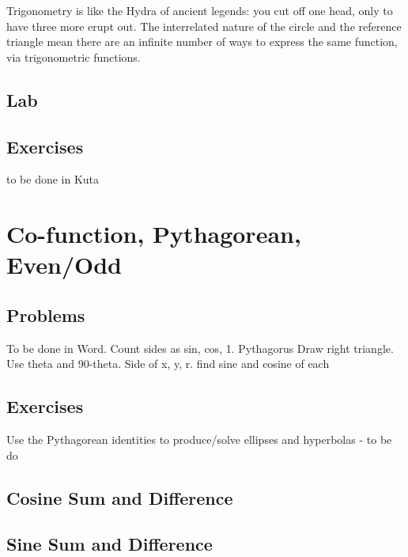 


Trigonometry is like the Hydra of ancient legends: you cut off one head, only to have
three more erupt out.  The interrelated nature of the circle and the reference triangle
mean there are an infinite number of ways to express the same function, via
trigonometric functions.


\newpage
\chapterminitoc


\newpage
{}
\subsection{Lab}
\noindent{}

\newpage
\subsection{Exercises}
to be done in Kuta


\newpage
\section{Co-function, Pythagorean, Even/Odd}
\subsection{Problems}
To be done in Word.
Count sides as sin, cos, 1.  Pythagorus
Draw right triangle.  Use theta and 90-theta.  Side of x, y, r.  find sine and cosine of each
\newpage

\newpage
\subsection{Exercises}
Use the Pythagorean identities to produce/solve ellipses and hyperbolas - to be do


\newpage
{}
\newpage
\subsection{Cosine Sum and Difference}
\subsection{Sine Sum and Difference}
